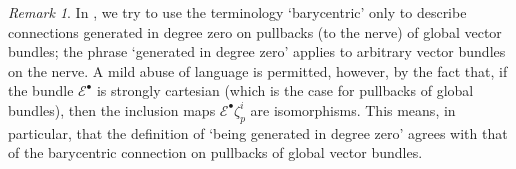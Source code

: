 \documentclass[11pt,fleqn]{article}
\theoremstyle{plain}
\theoremstyle{definition}
\theoremstyle{remark}
\newtheorem{remark}[theorem]{Remark}
\numberwithin{equation}{theorem}
\begin{document}
        \begin{remark}
            In \cite{Hosgood2020}, we try to use the terminology `barycentric' only to describe connections generated in degree zero on pullbacks (to the nerve) of global vector bundles; the phrase `generated in degree zero' applies to arbitrary vector bundles on the nerve.
            A mild abuse of language is permitted, however, by the fact that, if the bundle $\mathcal{E}^\bullet$ is strongly cartesian (which is the case for pullbacks of global bundles), then the inclusion maps $\mathcal{E}^\bullet\zeta_p^i$ are isomorphisms.
            This means, in particular, that the definition of ‘being generated in degree zero’ agrees with that of the barycentric connection on pullbacks of global vector bundles.
        \end{remark}
\end{document}
